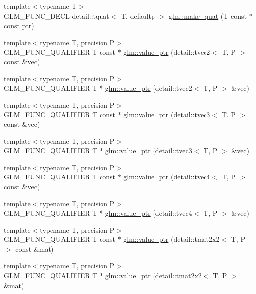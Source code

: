 \begin{CompactItemize}
\item 
{\footnotesize template$<$typename T$>$ }\\GLM\_\-FUNC\_\-DECL detail::tquat$<$ T, defaultp $>$ \hyperlink{group__gtc__type__ptr_gac5b8f1104856835d3d65d854362c85b}{glm::make\_\-quat} (T const $\ast$const ptr)
\item 
{\footnotesize template$<$typename T, precision P$>$ }\\GLM\_\-FUNC\_\-QUALIFIER T const $\ast$ \hyperlink{group__gtc__type__ptr_gb43f07f8b8793c17c58c7b5826d4d5ff}{glm::value\_\-ptr} (detail::tvec2$<$ T, P $>$ const \&vec)
\item 
{\footnotesize template$<$typename T, precision P$>$ }\\GLM\_\-FUNC\_\-QUALIFIER T $\ast$ \hyperlink{group__gtc__type__ptr_gfb7060ef2ca0edab610e0069ed911531}{glm::value\_\-ptr} (detail::tvec2$<$ T, P $>$ \&vec)
\item 
{\footnotesize template$<$typename T, precision P$>$ }\\GLM\_\-FUNC\_\-QUALIFIER T const $\ast$ \hyperlink{group__gtc__type__ptr_g5668973c91b739c1a19f0ef201ddce50}{glm::value\_\-ptr} (detail::tvec3$<$ T, P $>$ const \&vec)
\item 
{\footnotesize template$<$typename T, precision P$>$ }\\GLM\_\-FUNC\_\-QUALIFIER T $\ast$ \hyperlink{group__gtc__type__ptr_ga3e39c9c4cf1c1f573037fb2d6e6a1f9}{glm::value\_\-ptr} (detail::tvec3$<$ T, P $>$ \&vec)
\item 
{\footnotesize template$<$typename T, precision P$>$ }\\GLM\_\-FUNC\_\-QUALIFIER T const $\ast$ \hyperlink{group__gtc__type__ptr_gc66d56efb1b37e96a17d235374f53a03}{glm::value\_\-ptr} (detail::tvec4$<$ T, P $>$ const \&vec)
\item 
{\footnotesize template$<$typename T, precision P$>$ }\\GLM\_\-FUNC\_\-QUALIFIER T $\ast$ \hyperlink{group__gtc__type__ptr_g793e108db1bc068a8c09cf75c1b04389}{glm::value\_\-ptr} (detail::tvec4$<$ T, P $>$ \&vec)
\item 
{\footnotesize template$<$typename T, precision P$>$ }\\GLM\_\-FUNC\_\-QUALIFIER T const $\ast$ \hyperlink{group__gtc__type__ptr_g97a60e78c46993259f0cbac724d0b354}{glm::value\_\-ptr} (detail::tmat2x2$<$ T, P $>$ const \&mat)
\item 
{\footnotesize template$<$typename T, precision P$>$ }\\GLM\_\-FUNC\_\-QUALIFIER T $\ast$ \hyperlink{group__gtc__type__ptr_g2005106958abf8304187586557d11444}{glm::value\_\-ptr} (detail::tmat2x2$<$ T, P $>$ \&mat)

\end{CompactItemize}
